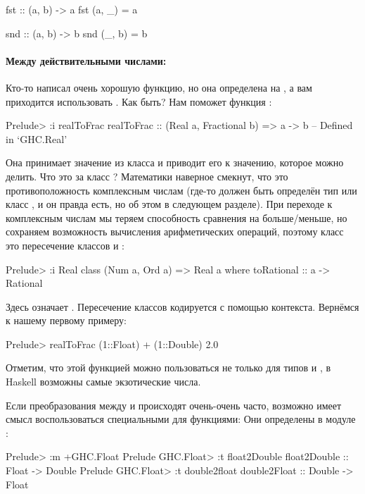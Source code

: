 \begin{code}
fst :: (a, b) -> a
fst (a, _) = a 

snd :: (a, b) -> b
snd (_, b) = b
\end{code}


\paragraph{Между действительными числами:} Кто-то написал
очень хорошую функцию, но она определена на , а 
вам приходится использовать . Как быть?
Нам поможет функция :

\begin{code}
Prelude> :i realToFrac
realToFrac :: (Real a, Fractional b) => a -> b
  	-- Defined in `GHC.Real'
\end{code}

Она принимает значение из класса  и приводит его
к значению, которое можно делить. Что это за класс ?
Математики наверное смекнут, что это противоположность
комплексным числам (где-то должен быть определён тип
или класс , и он правда есть, но 
об этом в следующем  разделе). При переходе к комплексным 
числам мы теряем способность сравнения на больше/меньше,
но сохраняем возможность вычисления арифметических операций,
поэтому класс  это пересечение классов  и :

\begin{code}
Prelude> :i Real
class (Num a, Ord a) => Real a where
  toRational :: a -> Rational
\end{code}

Здесь  означает . Пересечение 
классов кодируется с помощью контекста. Вернёмся к 
нашему первому примеру:

\begin{code}
Prelude> realToFrac (1::Float) + (1::Double)
2.0
\end{code}

Отметим, что этой функцией можно пользоваться не только
для типов  и , в Haskell возможны самые
экзотические числа.

Если преобразования между  и  
происходят очень-очень часто, возможно имеет смысл 
воспользоваться специальными для  функциями:
Они определены в модуле :

\begin{code}
Prelude> :m +GHC.Float
Prelude GHC.Float> :t float2Double
float2Double :: Float -> Double
Prelude GHC.Float> :t double2float
double2Float :: Double -> Float
\end{code}


